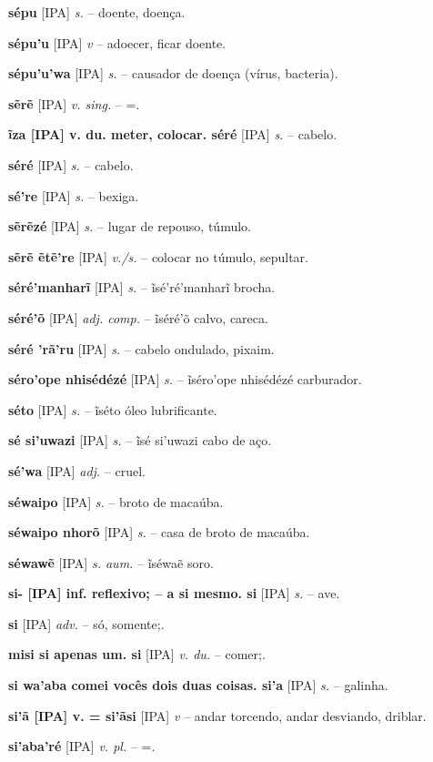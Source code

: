 {\textbf{sépu} [IPA] \textit{s.} -- doente, doença.

\textbf{sépu'u} [IPA] \textit{v} -- adoecer, ficar doente.

\textbf{sépu'u'wa} [IPA] \textit{s.} -- causador de doença (vírus, bacteria).

\textbf{sẽrẽ} [IPA] \textit{v. sing.} -- =.

\textbf{ĩza [IPA] v. du. meter, colocar. séré} [IPA] \textit{s.} -- cabelo.

\textbf{séré} [IPA] \textit{s.} -- cabelo.

\textbf{sé're} [IPA] \textit{s.} -- bexiga.

\textbf{sẽrẽzé} [IPA] \textit{s.} -- lugar de repouso, túmulo.

\textbf{sẽrẽ ẽtẽ're} [IPA] \textit{v./s.} -- colocar no túmulo, sepultar.

\textbf{séré'manharĩ} [IPA] \textit{s.} -- ĩsé'ré'manharĩ brocha.

\textbf{séré'õ} [IPA] \textit{adj. comp.} -- ĩséré'õ calvo, careca.

\textbf{séré 'rã'ru} [IPA] \textit{s.} -- cabelo ondulado, pixaim.

\textbf{séro'ope nhisédézé} [IPA] \textit{s.} -- ĩséro'ope nhisédézé carburador.

\textbf{séto} [IPA] \textit{s.} -- ĩséto óleo lubrificante.

\textbf{sé si'uwazi} [IPA] \textit{s.} -- ĩsé si'uwazi cabo de aço.

\textbf{sé'wa} [IPA] \textit{adj.} -- cruel.

\textbf{séwaipo} [IPA] \textit{s.} -- broto de macaúba.

\textbf{séwaipo nhorõ} [IPA] \textit{s.} -- casa de broto de macaúba.

\textbf{séwawẽ} [IPA] \textit{s. aum.} -- ĩséwaẽ soro.

\textbf{si- [IPA] inf. reflexivo; -- a si mesmo. si} [IPA] \textit{s.} -- ave.

\textbf{si} [IPA] \textit{adv.} -- só, somente;.

\textbf{misi si apenas um. si} [IPA] \textit{v. du.} -- comer;.

\textbf{si wa'aba comei vocês dois duas coisas. si'a} [IPA] \textit{s.} -- galinha.

\textbf{si'ã [IPA] v. = si'ãsi} [IPA] \textit{v} -- andar torcendo, andar desviando, driblar.

\textbf{si'aba'ré} [IPA] \textit{v. pl.} -- =.

}
